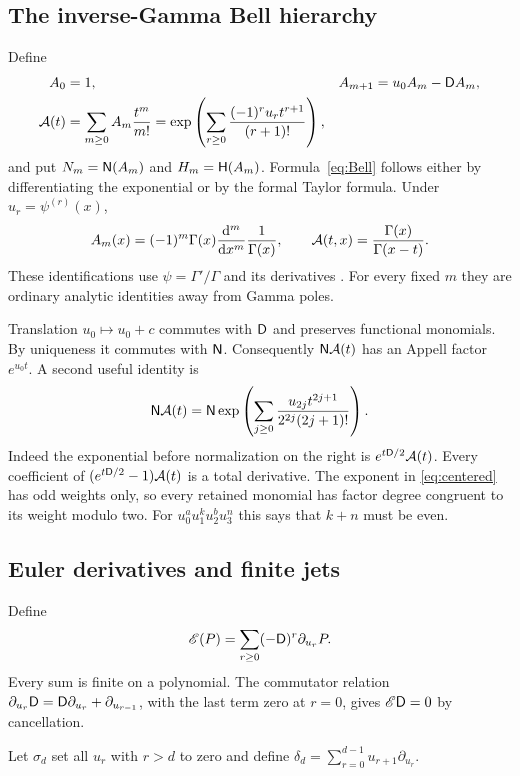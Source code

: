 \subsection{The inverse-Gamma Bell hierarchy}
Define
\begin{align}
 A_0&=1,& A_{m+1}&=u_0A_m-\mathsf D A_m,\label{eq:Bell-recur}\\
 \mathcal A(t)&=\sum_{m\ge0}A_m\frac{t^m}{m!}
 =\exp\left(\sum_{r\ge0}\frac{(-1)^ru_rt^{r+1}}{(r+1)!}\right),
 \label{eq:Bell}\end{align}
and put $N_m=\mathsf N(A_m)$ and $H_m=\mathsf H(A_m)$.
Formula~\eqref{eq:Bell} follows either by differentiating the exponential
or by the formal Taylor formula. Under $u_r=\psi^{(r)}(x)$,
\begin{equation}\label{eq:Gamma-realization}
 A_m(x)=(-1)^m\Gamma(x)\frac{\mathrm d^m}{\mathrm dx^m}\frac1{\Gamma(x)},
 \qquad \mathcal A(t,x)=\frac{\Gamma(x)}{\Gamma(x-t)}.
\end{equation}
These identifications use $\psi=\Gamma'/\Gamma$ and its derivatives
\cite{DLMF5}. For every fixed $m$ they are ordinary analytic identities
away from Gamma poles.

Translation $u_0\mapsto u_0+c$ commutes with $\mathsf D$ and preserves
functional monomials. By uniqueness it commutes with $\mathsf N$. Consequently
$\mathsf N\mathcal A(t)$ has an Appell factor $e^{u_0t}$. A second useful identity is
\begin{equation}\label{eq:centered}
 \mathsf N\mathcal A(t)=\mathsf N\exp\left(
 \sum_{j\ge0}\frac{u_{2j}t^{2j+1}}{2^{2j}(2j+1)!}\right).
\end{equation}
Indeed the exponential before normalization on the right is
$e^{t\mathsf D/2}\mathcal A(t)$. Every coefficient of
$(e^{t\mathsf D/2}-1)\mathcal A(t)$ is a total derivative. The exponent in
\eqref{eq:centered} has odd weights only, so every retained monomial has
factor degree congruent to its weight modulo two. For
$u_0^a u_1^k u_2^b u_3^n$ this says that $k+n$ must be even.

\subsection{Euler derivatives and finite jets}
Define
\[
 \mathscr E(P)=\sum_{r\ge0}(-\mathsf D)^r\partial_{u_r}P.
\]
Every sum is finite on a polynomial. The commutator relation
$\partial_{u_r}\mathsf D=\mathsf D\partial_{u_r}+\partial_{u_{r-1}}$, with the
last term zero at $r=0$, gives $\mathscr E\mathsf D=0$ by cancellation.

Let $\sigma_d$ set all $u_r$ with $r>d$ to zero and define
$\delta_d=\sum_{r=0}^{d-1}u_{r+1}\partial_{u_r}$.

